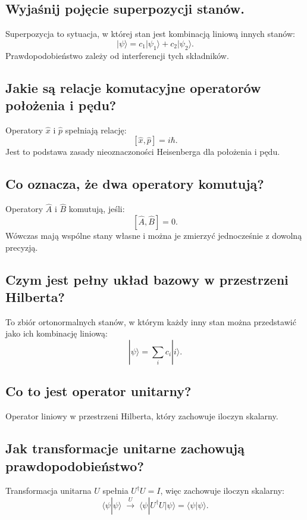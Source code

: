 \subsection{Wyjaśnij pojęcie superpozycji stanów.}

Superpozycja to sytuacja, w której stan jest kombinacją liniową innych stanów:
\[
|\psi\rangle = c_1|\psi_1\rangle + c_2|\psi_2\rangle.
\]
Prawdopodobieństwo zależy od interferencji tych składników.


\subsection{Jakie są relacje komutacyjne operatorów położenia i pędu?}

Operatory $\hat{x}$ i $\hat{p}$ spełniają relację:
\[
[\hat{x}, \hat{p}] = i\hbar.
\]
Jest to podstawa zasady nieoznaczoności Heisenberga dla położenia i pędu.

\subsection{Co oznacza, że dwa operatory komutują?}

Operatory $\hat{A}$ i $\hat{B}$ komutują, jeśli:
\[
[\hat{A}, \hat{B}] = 0.
\]
Wówczas mają wspólne stany własne i można je zmierzyć jednocześnie z dowolną precyzją.

\subsection{Czym jest pełny układ bazowy w przestrzeni Hilberta?}

To zbiór ortonormalnych stanów, w którym każdy inny stan można przedstawić jako ich kombinację liniową:
\[
|\psi\rangle = \sum_i c_i |i\rangle.
\]

\subsection{Co to jest operator unitarny?}

Operator liniowy w przestrzeni Hilberta, który zachowuje iloczyn skalarny.

\subsection{Jak transformacje unitarne zachowują prawdopodobieństwo?}

Transformacja unitarna $U$ spełnia $U^\dagger U = I$, więc zachowuje iloczyn skalarny:
\[
\langle \psi | \psi \rangle
\;\xrightarrow{\,U\,}\;
\langle \psi | U^\dagger U | \psi \rangle
= \langle \psi | \psi \rangle.
\]

